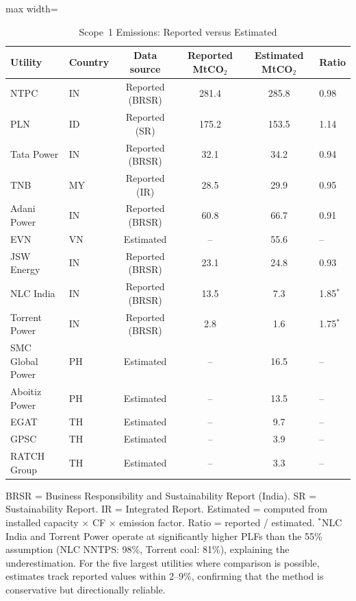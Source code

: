 \documentclass[review,3p,authoryear]{elsarticle}
\begin{document}
\begin{table}[H]
\centering
\caption{Scope~1 Emissions: Reported versus Estimated}
\label{tab:emissions_validation}
\small
\begin{adjustbox}{max width=\linewidth}
\begin{tabular}{@{}llcccl@{}}
\toprule
\textbf{Utility} & \textbf{Country} & \textbf{Data source} & \textbf{Reported MtCO$_2$} & \textbf{Estimated MtCO$_2$} & \textbf{Ratio} \\
\midrule
NTPC & IN & Reported (BRSR) & 281.4 & 285.8 & 0.98 \\
PLN & ID & Reported (SR) & 175.2 & 153.5 & 1.14 \\
Tata Power & IN & Reported (BRSR) & 32.1 & 34.2 & 0.94 \\
TNB & MY & Reported (IR) & 28.5 & 29.9 & 0.95 \\
Adani Power & IN & Reported (BRSR) & 60.8 & 66.7 & 0.91 \\
EVN & VN & Estimated & -- & 55.6 & -- \\
JSW Energy & IN & Reported (BRSR) & 23.1 & 24.8 & 0.93 \\
NLC India & IN & Reported (BRSR) & 13.5 & 7.3 & 1.85$^{*}$ \\
Torrent Power & IN & Reported (BRSR) & 2.8 & 1.6 & 1.75$^{*}$ \\
SMC Global Power & PH & Estimated & -- & 16.5 & -- \\
Aboitiz Power & PH & Estimated & -- & 13.5 & -- \\
EGAT & TH & Estimated & -- & 9.7 & -- \\
GPSC & TH & Estimated & -- & 3.9 & -- \\
RATCH Group & TH & Estimated & -- & 3.3 & -- \\
\bottomrule
\end{tabular}
\end{adjustbox}
\begin{flushleft}
\footnotesize{BRSR = Business Responsibility and Sustainability Report (India). SR = Sustainability Report. IR = Integrated Report. Estimated = computed from installed capacity $\times$ CF $\times$ emission factor. Ratio = reported / estimated. $^{*}$NLC India and Torrent Power operate at significantly higher PLFs than the 55\% assumption (NLC NNTPS: 98\%, Torrent coal: 81\%), explaining the underestimation. For the five largest utilities where comparison is possible, estimates track reported values within 2--9\%, confirming that the method is conservative but directionally reliable.}
\end{flushleft}
\end{table}
\end{document}
